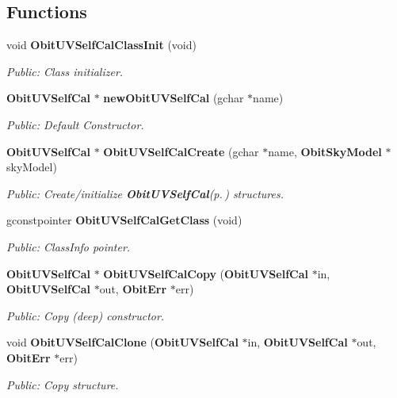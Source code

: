 \subsection*{Functions}
\begin{CompactItemize}
\item 
void {\bf Obit\-UVSelf\-Cal\-Class\-Init} (void)
\begin{CompactList}\small\item\em Public: Class initializer. \item\end{CompactList}\item 
{\bf Obit\-UVSelf\-Cal} $\ast$ {\bf new\-Obit\-UVSelf\-Cal} (gchar $\ast$name)
\begin{CompactList}\small\item\em Public: Default Constructor. \item\end{CompactList}\item 
{\bf Obit\-UVSelf\-Cal} $\ast$ {\bf Obit\-UVSelf\-Cal\-Create} (gchar $\ast$name, {\bf Obit\-Sky\-Model} $\ast$sky\-Model)
\begin{CompactList}\small\item\em Public: Create/initialize {\bf Obit\-UVSelf\-Cal}{\rm (p.\,\pageref{structObitUVSelfCal})} structures. \item\end{CompactList}\item 
gconstpointer {\bf Obit\-UVSelf\-Cal\-Get\-Class} (void)
\begin{CompactList}\small\item\em Public: Class\-Info pointer. \item\end{CompactList}\item 
{\bf Obit\-UVSelf\-Cal} $\ast$ {\bf Obit\-UVSelf\-Cal\-Copy} ({\bf Obit\-UVSelf\-Cal} $\ast$in, {\bf Obit\-UVSelf\-Cal} $\ast$out, {\bf Obit\-Err} $\ast$err)
\begin{CompactList}\small\item\em Public: Copy (deep) constructor. \item\end{CompactList}\item 
void {\bf Obit\-UVSelf\-Cal\-Clone} ({\bf Obit\-UVSelf\-Cal} $\ast$in, {\bf Obit\-UVSelf\-Cal} $\ast$out, {\bf Obit\-Err} $\ast$err)
\begin{CompactList}\small\item\em Public: Copy structure. \item\end{CompactList}\item 

\end{CompactItemize}
